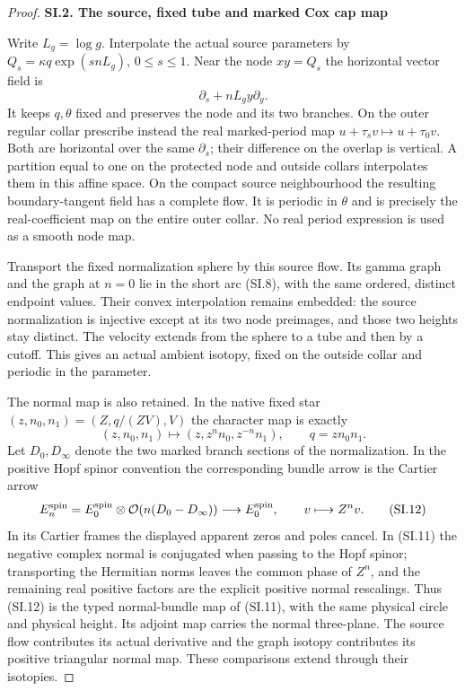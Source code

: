 \begin{proof}
\medskip\noindent\textbf{SI.2. The source, fixed tube and marked Cox cap map}

\par\nobreak

Write \(L_g=\log g\). Interpolate the actual source parameters by
\(Q_s=\kappa q\exp(snL_g)\), \(0\le s\le1\). Near the node \(xy=Q_s\)
the horizontal vector field is
\[
 \partial_s+nL_g y\partial_y.                         \tag{SI.10}
\]
It keeps \(q,\theta\) fixed and preserves the node and its two branches.
On the outer regular collar prescribe instead the real marked-period
map \(u+\tau_s v\mapsto u+\tau_0v\). Both are horizontal over the same
\(\partial_s\); their difference on the overlap is vertical. A partition
equal to one on the protected node and outside collars interpolates
them in this affine space. On the compact source neighbourhood the
resulting boundary-tangent field has a complete flow. It is periodic
in \(\theta\) and is precisely the real-coefficient map on the entire
outer collar. No real period expression is used as a smooth node map.

Transport the fixed normalization sphere by this source flow. Its
gamma graph and the graph at \(n=0\) lie in the short arc (SI.8), with
the same ordered, distinct endpoint values. Their convex interpolation
remains embedded: the source normalization is injective except at its
two node preimages, and those two heights stay distinct. The velocity
extends from the sphere to a tube and then by a cutoff. This gives an
actual ambient isotopy, fixed on the outside collar and periodic in
the parameter.

The normal map is also retained. In the native fixed star
\((z,n_0,n_1)=(Z,q/(ZV),V)\) the character map is exactly
\[
 (z,n_0,n_1)\longmapsto(z,z^n n_0,z^{-n}n_1),
 \qquad q=zn_0n_1.                                  \tag{SI.11}
\]
Let \(D_0,D_\infty\) denote the two marked branch sections of the
normalization. In the positive Hopf spinor convention the corresponding
bundle arrow is the Cartier arrow
\[
 E_n^{\rm spin}=E_0^{\rm spin}\otimes
               \mathcal O(n(D_0-D_\infty))
       \longrightarrow E_0^{\rm spin},\qquad v\longmapsto Z^n v.
                                                        \tag{SI.12}
\]
In its Cartier frames the displayed apparent zeros and poles cancel.
In (SI.11) the negative complex normal is conjugated when passing to
the Hopf spinor; transporting the Hermitian norms leaves the common
phase of \(Z^n\), and the remaining real positive factors are the
explicit positive normal rescalings. Thus (SI.12) is the typed
normal-bundle map of (SI.11), with the same physical circle and
physical height. Its adjoint map carries the normal three-plane.
The source flow contributes its actual derivative and the graph
isotopy contributes its positive triangular normal map. These
comparisons extend through their isotopies.


\end{proof}

